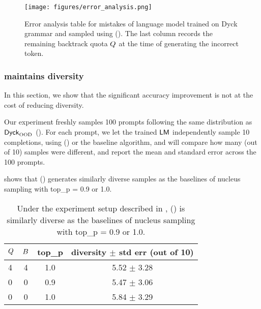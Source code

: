 \begin{figure*}[!h]
  \centering
  \begin{minipage}[b]{1.0\textwidth}  %
    \centering
    \texttt{[image: figures/error\_analysis.png]}  %
  \end{minipage}
  \caption{
  Error analysis table for mistakes of language model trained on Dyck grammar and sampled using \algoName ().
  The last column records the remaining backtrack quota $Q$ at the time of generating the incorrect token.
  }  
  \label{fig:error_analysis}
\end{figure*}




\clearpage
\subsubsection{\algoName maintains diversity}
\label{sec:experiments:synthetic:diversity}

In this section, we show that the significant accuracy improvement is not at the cost of reducing diversity.

Our experiment freshly samples 100 prompts following the same distribution as $\mathsf{Dyck}_{\text{OOD}}$ ().
For each prompt, we let the trained $\mathsf{LM}$ independently sample 10 completions,
using \algoName () or the baseline algorithm,
and will compare how many (out of 10) samples were different,
and report the mean and standard error across the 100 prompts.

 shows that \algoName () generates similarly diverse samples as the baselines of
nucleus sampling with top\_p = 0.9 or 1.0.


\begin{table*}[h]
\begin{center}
\begin{small}
\begin{tabular}{ lccc }
\toprule
\textbf{$Q$} & \textbf{$B$} & \textbf{top\_p} & \textbf{diversity $\pm$ std err (out of 10)}  \\
\hline
4 & 4 & 1.0 & 5.52 $\pm$ 3.28  \\
\hline
0 & 0 & 0.9 &  5.47 $\pm$ 3.06  \\
\hline
0 & 0 & 1.0 & 5.84 $\pm$ 3.29  \\
\bottomrule
\end{tabular}
\end{small}
\end{center}
\caption{
Under the experiment setup described in ,
\algoName () is similarly diverse as the baselines of
nucleus sampling with top\_p = 0.9 or 1.0.
}
\label{table:dyck_diversity}
\end{table*}




